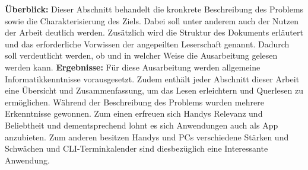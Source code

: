 
\textbf{Überblick:}
Dieser Abschnitt behandelt die kronkrete Beschreibung des Problems sowie die Charakterisierung des Ziels. Dabei soll unter anderem auch der Nutzen der Arbeit deutlich werden.\newline
Zusätzlich wird die Struktur des Dokuments erläutert und das erforderliche Vorwissen der angepeilten Leserschaft genannt. Dadurch soll verdeutlicht werden, ob und in welcher Weise die Ausarbeitung gelesen werden kann.\newline
\textbf{Ergebnisse:}
Für diese Ausarbeitung werden allgemeine Informatikkenntnisse vorausgesetzt. 
Zudem enthält jeder Abschnitt dieser Arbeit eine Übersicht und Zusammenfassung, um das Lesen erleichtern und Querlesen zu ermöglichen.\newline
Während der Beschreibung des Problems wurden mehrere Erkenntnisse gewonnen. Zum einen erfreuen sich Handys Relevanz und Beliebtheit und dementsprechend lohnt es sich Anwendungen auch als App anzubieten. Zum anderen besitzen Handys und PCs verschiedene Stärken und Schwächen und CLI-Terminkalender sind diesbezüglich eine Interessante Anwendung.